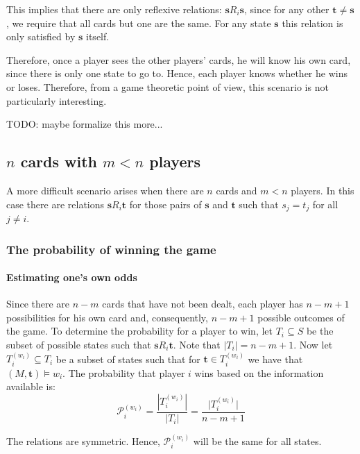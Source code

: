 \documentclass[a4paper,10pt]{article}
\begin{document}
This implies that there are only reflexive relations: $\boldsymbol s R_i \boldsymbol s$, since for any other $\boldsymbol t \neq \boldsymbol s$, we require that all cards but one are the same. For any state $\boldsymbol s$ this relation is only satisfied by $\boldsymbol s$ itself.

Therefore, once a player sees the other players' cards, he will know his own card, since there is only one state to go to. Hence, each player knows whether he wins or loses. Therefore, from a game theoretic point of view, this scenario is not particularly interesting.

TODO: maybe formalize this more...

\subsection{$n$ cards with $m<n$ players}
A more difficult scenario arises when there are $n$ cards and $m < n$ players. In this case there are relations $\boldsymbol s R_i \boldsymbol t$ for those pairs of $\boldsymbol s$ and $\boldsymbol t$ such that $s_j = t_j$ for all $j\neq i$.

\subsubsection{The probability of winning the game}

\paragraph{Estimating one's own odds}
Since there are $n-m$ cards that have not been dealt, each player has $n-m+1$ possibilities for his own card and, consequently, $n-m+1$ possible outcomes of the game. To determine the probability for a player to win, let $T_i \subseteq S$ be the subset of possible states such that $\boldsymbol s R_i \boldsymbol t$. Note that $|T_i| = n-m+1$. Now let $T^{(w_i)}_i \subseteq T_i$ be a subset of states such that for $\boldsymbol t \in T^{(w_i)}_i$ we have that $(M,\boldsymbol t) \models w_i$. The probability that player $i$ wins based on the information available is:
\begin{equation}
\mathcal{P}^{(w_i)}_i = \frac{|T^{(w_i)}_i|}{|T_i|} = \frac{\lvert T^{(w_i)}_i\rvert}{n-m+1}
\label{eq:winprob}
\end{equation}

The relations are symmetric. Hence, $\mathcal{P}^{(w_i)}_i$ will be the same for all states.
\end{document}
